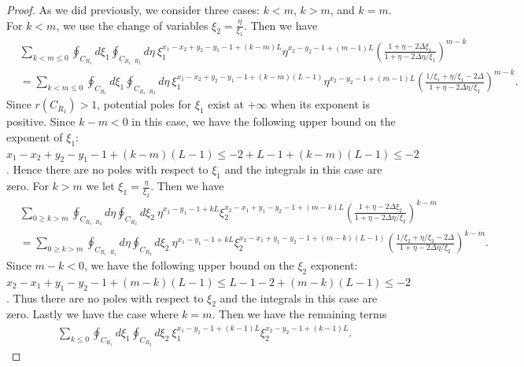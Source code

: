 \documentclass[a4paper,11pt]{article}
\theoremstyle{definition}
\begin{document}
\begin{proof}
As we did previously, we consider three cases: $k<m$, $k>m$, and $k=m$. For $k<m$, we use the change of variables $\xi_2=\frac{\eta}{\xi_1}$. Then we have 
\begin{equation}
    \begin{split}
        &\sum_{k<m\leq 0} \oint_{C_{R_1}}d\xi_1\oint_{C_{R_1\cdot R_2}}d\eta \ \xi_1^{x_1-x_2+y_2-y_1-1+(k-m)L} \eta^{x_2-y_2-1+(m-1)L}\left(\frac{1+\eta-2\Delta\xi_1}{1+\eta-2\Delta\eta/\xi_1} \right)^{m-k} \\
        &=\sum_{k<m\leq0} \oint_{C_{R_1}}d\xi_1\oint_{C_{R_1\cdot R_2}}d\eta \ \xi_1^{x_1-x_2+y_2-y_1-1+(k-m)(L-1)} \eta^{x_2-y_2-1+(m-1)L}\left(\frac{1/\xi_1+\eta/\xi_1-2\Delta}{1+\eta-2\Delta\eta/\xi_1} \right)^{m-k}.
    \end{split}
\end{equation}
 Since $r(C_{R_1})>1$, potential poles for $\xi_1$ exist at $+\infty$ when its exponent is positive. Since $k-m<0$ in this case, we have the following upper bound on the exponent of $\xi_1$: $x_1-x_2+y_2-y_1-1+(k-m)(L-1)\leq -2 + L-1 +(k-m)(L-1) \leq -2$. Hence there are no poles with respect to $\xi_1$ and the integrals in this case are zero. For $k>m$ we let $\xi_1=\frac{\eta}{\xi_2}$. Then we have 
\begin{equation}
    \begin{split}
        &\sum_{0\geq k>m} \oint_{C_{R_1 \cdot R_2}}d\eta\oint_{C_{R_2}}d\xi_2 \ \eta^{x_1-y_1-1+kL} \xi_2^{x_2-x_1+y_1-y_2-1+(m-k)L}\left(\frac{1+\eta-2\Delta\xi_2}{1+\eta-2\Delta\eta/\xi_2} \right)^{k-m} \\
        &= \sum_{0\geq k>m} \oint_{C_{R_1\cdot R_1}}d\eta\oint_{C_{R_2}}d\xi_2 \ \eta^{x_1-y_1-1+kL} \xi_2^{x_2-x_1+y_1-y_2-1+(m-k)(L-1)}\left(\frac{1/\xi_2+\eta/\xi_2-2\Delta}{1+\eta-2\Delta\eta/\xi_2} \right)^{k-m}.
    \end{split}
\end{equation}
Since $m-k<0$, we have the following upper bound on the $\xi_2$ exponent: $x_2-x_1+y_1-y_2-1+(m-k)(L-1)\leq L-1 - 2 + (m-k)(L-1) \leq -2$. Thus there are no poles with respect to $\xi_2$ and the integrals in this case are zero. Lastly we have the case where $k=m$. Then we have the remaining terms 
\begin{equation}
    \begin{split}
        \sum_{k\leq 0}\oint_{C_{R_1}}d\xi_1 \oint_{C_{R_2}}d\xi_2 \ \xi_1^{x_1-y_1 - 1 +(k-1)L}\xi_2^{x_2-y_2-1+(k-1)L}.
    \end{split}
\end{equation}


\end{proof}
\end{document}
